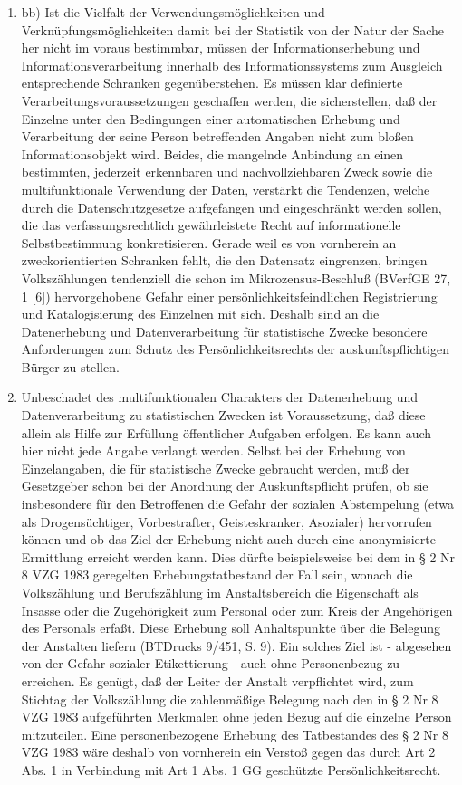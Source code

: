 \begin{enumerate}[label=\arabic*,start=104]
            \item bb) Ist die Vielfalt der Verwendungsmöglichkeiten und Verknüpfungsmöglichkeiten damit bei der Statistik von der Natur der Sache her nicht im voraus bestimmbar, müssen der Informationserhebung und Informationsverarbeitung innerhalb des Informationssystems zum Ausgleich entsprechende Schranken gegenüberstehen. Es müssen klar definierte Verarbeitungsvoraussetzungen geschaffen werden, die sicherstellen, daß der Einzelne unter den Bedingungen einer automatischen Erhebung und Verarbeitung der seine Person betreffenden Angaben nicht zum bloßen Informationsobjekt wird. Beides, die mangelnde Anbindung an einen bestimmten, jederzeit erkennbaren und nachvollziehbaren Zweck sowie die multifunktionale Verwendung der Daten, verstärkt die Tendenzen, welche durch die Datenschutzgesetze aufgefangen und eingeschränkt werden sollen, die das verfassungsrechtlich gewährleistete Recht auf informationelle Selbstbestimmung konkretisieren. Gerade weil es von vornherein an zweckorientierten Schranken fehlt, die den Datensatz eingrenzen, bringen Volkszählungen tendenziell die schon im Mikrozensus-Beschluß (BVerfGE 27, 1 [6]) hervorgehobene Gefahr einer persönlichkeitsfeindlichen Registrierung und Katalogisierung des Einzelnen mit sich. Deshalb sind an die Datenerhebung und Datenverarbeitung für statistische Zwecke besondere Anforderungen zum Schutz des Persönlichkeitsrechts der auskunftspflichtigen Bürger zu stellen.
            \item Unbeschadet des multifunktionalen Charakters der Datenerhebung und Datenverarbeitung zu statistischen Zwecken ist Voraussetzung, daß diese allein als Hilfe zur Erfüllung öffentlicher Aufgaben erfolgen. Es kann auch hier nicht jede Angabe verlangt werden. Selbst bei der Erhebung von Einzelangaben, die für statistische Zwecke gebraucht werden, muß der Gesetzgeber schon bei der Anordnung der Auskunftspflicht prüfen, ob sie insbesondere für den Betroffenen die Gefahr der sozialen Abstempelung (etwa als Drogensüchtiger, Vorbestrafter, Geisteskranker, Asozialer) hervorrufen können und ob das Ziel der Erhebung nicht auch durch eine anonymisierte Ermittlung erreicht werden kann. Dies dürfte beispielsweise bei dem in § 2 Nr 8 VZG 1983 geregelten Erhebungstatbestand der Fall sein, wonach die Volkszählung und Berufszählung im Anstaltsbereich die Eigenschaft als Insasse oder die Zugehörigkeit zum Personal oder zum Kreis der Angehörigen des Personals erfaßt. Diese Erhebung soll Anhaltspunkte über die Belegung der Anstalten liefern (BTDrucks 9/451, S. 9). Ein solches Ziel ist - abgesehen von der Gefahr sozialer Etikettierung - auch ohne Personenbezug zu erreichen. Es genügt, daß der Leiter der Anstalt verpflichtet wird, zum Stichtag der Volkszählung die zahlenmäßige Belegung nach den in § 2 Nr 8 VZG 1983 aufgeführten Merkmalen ohne jeden Bezug auf die einzelne Person mitzuteilen. Eine personenbezogene Erhebung des Tatbestandes des § 2 Nr 8 VZG 1983 wäre deshalb von vornherein ein Verstoß gegen das durch Art 2 Abs. 1 in Verbindung mit Art 1 Abs. 1 GG geschützte Persönlichkeitsrecht.

\end{enumerate}
